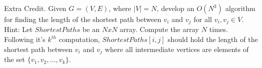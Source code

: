 Extra Credit.  Given $G=(V,E)$, where $|V|=N$, develop an $O(N^{3})$ algorithm
for finding the length of the shortest path between $v_{i}$ and $v_{j}$ for all
$v_{i},v_{j}\in  V$.
Hint: Let $ShortestPaths$ be an $N x N$ array.  Compute
the array $N$ times.  Following it's $k^{th}$ 
computation, $ShortestPaths[i,j]$ should hold the length of the shortest 
path between $v_{i}$ and $v_{j}$ where all intermediate vertices are elements 
of the set $\{v_{1},v_{2},\ldots,v_{k}\}$.

